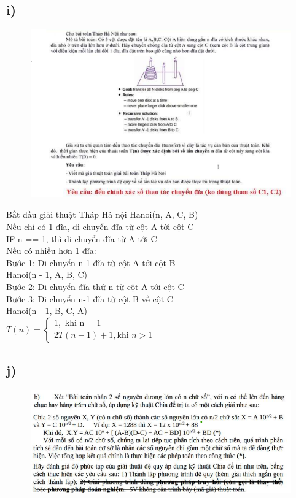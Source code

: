\documentclass[10pt,a4paper]{article}
\begin{document}
\subsection*{i)}
\begin{figure}[H]
    \centering
    \includegraphics[scale=.7]{images/1i.png}
    \label{fig:my_label}
\end{figure}
Bắt đầu giải thuật Tháp Hà nội Hanoi(n, A, C, B)\\
Nếu chỉ có 1 đĩa, di chuyển đĩa từ cột A tới cột C\\
IF n == 1, thì
      di chuyển đĩa từ A tới C  \\   

Nếu có nhiều hơn 1 đĩa:\\

Bước 1: Di chuyển n-1 đĩa từ cột A tới cột B\\
 Hanoi(n - 1, A, B, C)\\
Bước 2: Di chuyển đĩa thứ n từ cột A tới cột C\\

Bước 3: Di chuyển n-1 đĩa từ cột B về cột C\\
Hanoi(n - 1, B, C, A) \\
$
T(n) = 
    \begin{cases}
        1, \text{ khi n = 1} \\
        2T(n-1) + 1, \text{khi $n>1$}
    \end{cases}
$
\subsection*{j)}
\begin{figure}[H]
    \centering
    \includegraphics[scale=.7]{images/1j.png}
    \label{fig:my_label}
\end{figure}
\end{document}
